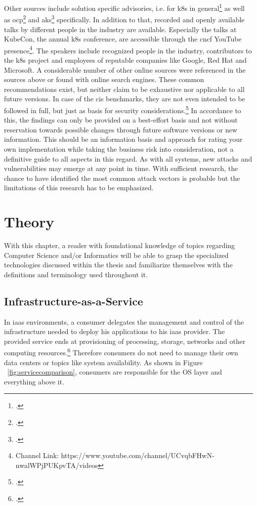 Other sources include solution specific advisories, i.e. for \gls{k8s} in general\footcite{k8sDocsSecurity} as well as \gls{ocp}\footcite{ocpSecTips} and \gls{aks}\footcite{aksSecTips} specifically. In addition to that, recorded and openly available talks by different people in the industry are available. Especially the talks at KubeCon, the annual \gls{k8s} conference, are accessible through the \gls{cncf} YouTube presence\footnote{Channel Link: https://www.youtube.com/channel/UCvqbFHwN-nwalWPjPUKpvTA/videos}. The speakers include recognized people in the industry, contributors to the \gls{k8s} project and employees of reputable companies like Google, Red Hat and Microsoft.
A considerable number of other online sources were referenced in the sources above or found with online search engines.
These common recommendations exist, but neither claim to be exhaustive nor applicable to all future versions. In case of the \gls{cis} benchmarks, they are not even intended to be followed in full, but just as basis for security considerations.\footcite[][, starting at 29:18]{cisJustRecommendation}
In accordance to this, the findings can only be provided on a best-effort basis and not without reservation towards possible changes through future software versions or new information. This should be an information basis and approach for rating your own implementation while taking the business risk into consideration, not a definitive guide to all aspects in this regard.
As with all systems, new attacks and vulnerabilities may emerge at any point in time. With sufficient research, the chance to have identified the most common attack vectors is probable but the limitations of this research has to be emphasized.


\chapter{Theory}
With this chapter, a reader with foundational knowledge of topics regarding Computer Science and/or Informatics 
will be able to grasp the specialized technologies discussed within the thesis and familiarize themselves with the definitions and terminology used throughout it.

\section{Infrastructure-as-a-Service}
In \gls{iaas} environments, a consumer delegates the management and control of the infrastructure needed to deploy his applications to his \gls{iaas} provider.
The provided service ends at provisioning of processing, storage, networks and other computing resources.\footcite[][p. 2 to 3]{nistcloud}
Therefore consumers do not need to manage their own data centers or topics like system  availability.
As shown in Figure ~\ref{fig:servicecomparison}, consumers are responsible for the OS layer and everything above it.

